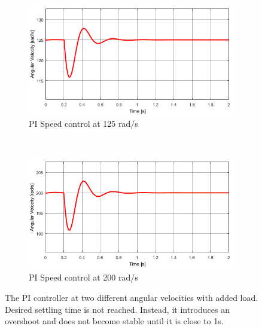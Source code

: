 \begin{figure}[h!]
	\centering
	\begin{subfigure}[b]{0.45\textwidth}
		\includegraphics[width=\textwidth]{graphics/PI_load125}
		\caption{PI Speed control at 125 rad/s}
		\label{fig:piload125}
	\end{subfigure}
	~ %
	\begin{subfigure}[b]{0.45\textwidth}
		\includegraphics[width=\textwidth]{graphics/PI_load200}
		\caption{PI Speed control at 200 rad/s}
		\label{fig:piload200}
	\end{subfigure}
	\caption{The PI controller at two different angular velocities with added load. Desired settling time is not reached. Instead, it introduces an overshoot and does not become stable until it is close to 1s.}
	\label{fig:piload}
\end{figure}


